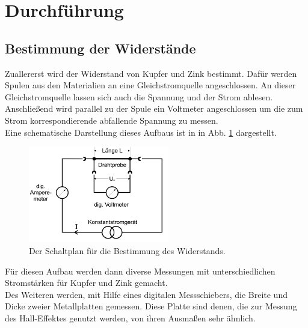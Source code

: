 \section{Durchführung}

\subsection{Bestimmung der Widerstände}
Zuallererst wird der Widerstand von Kupfer und Zink bestimmt. Dafür werden Spulen aus den Materialien an eine Gleichstromquelle angeschlossen.
An dieser Gleichstromquelle lassen sich auch die Spannung und der Strom ablesen.
Anschließend wird parallel zu der Spule ein Voltmeter angeschlossen um die zum Strom korrespondierende abfallende Spannung zu messen.\\
Eine schematische Darstellung dieses Aufbaus ist in in Abb. \ref{img:hall} dargestellt.
\begin{figure}[H]
    \centering
    \includegraphics[width=0.55\textwidth]{images/widerstandmessung.PNG}
    \caption{Der Schaltplan für die Bestimmung des Widerstands\protect \cite{V311}.}
    \label{img:hall}
  \end{figure}
\noindent
Für diesen Aufbau werden dann diverse Messungen mit unterschiedlichen Stromstärken für Kupfer und Zink gemacht.\\
Des Weiteren werden, mit Hilfe eines digitalen Messschiebers, die Breite und Dicke zweier Metallplatten gemessen. Diese Platte sind denen, die zur Messung des Hall-Effektes genutzt werden, 
von ihren Ausmaßen sehr ähnlich.\\



